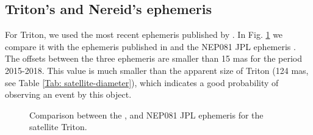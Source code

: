 \documentclass[useAMS,usenatbib]{mn2e}
\begin{document}
\subsection{Triton's and Nereid's ephemeris}

For Triton, we used the most recent ephemeris published by \cite{Emelyanov2015}. In Fig. \ref{Fig:eph-Triton} we compare it with the ephemeris published in \cite{Zhang2014} and the NEP081 JPL ephemeris \citep{Jacobson2009}. The offsets between the three ephemeris are smaller than 15 mas for the period 2015-2018. This value is much smaller than the apparent size of Triton (124 mas, see Table \ref{Tab: satellite-diameter}), which indicates a good probability of observing an event by this object.

\begin{figure}
\begin{centering}
\caption{Comparison between the \protect\cite{Emelyanov2015}, \protect\cite{Zhang2014} and NEP081 JPL \protect\citep{Jacobson2009} ephemeris for the satellite Triton.}
\label{Fig:eph-Triton}
\end{centering}
\end{figure}
\end{document}
